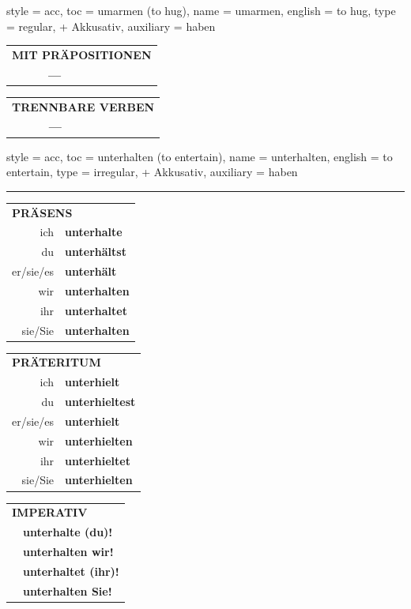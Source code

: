 \begin{verbentry}{
  style = {acc},
  toc = {umarmen (to hug)},
  name = {umarmen},
  english = {to hug},
  type = {regular, + Akkusativ},
  auxiliary = {haben}
}
\vspace{10pt}

\begin{tabular}{lll}
\multicolumn{3}{l}{\textbf{MIT PRÄPOSITIONEN}}\\
& \textbf{---} & \\
\end{tabular}
\hfill
\begin{tabular}{lll}
\multicolumn{3}{l}{\textbf{TRENNBARE VERBEN}}\\
& \textbf{---} & \\
\end{tabular}

\vspace{-5pt}
\end{verbentry}

\begin{verbentry}{
  style = {acc},
  toc = {unterhalten (to entertain)},
  name = {unterhalten},
  english = {to entertain},
  type = {irregular, + Akkusativ},
  auxiliary = {haben}
}


\vspace{5pt}
\hrule
\vspace{5pt}

\begin{tabular}{rl}
\multicolumn{2}{l}{\textbf{PRÄSENS}}\\
ich & \textbf{unterhalte}\\
du & \textbf{unterhältst}\\
er/sie/es & \textbf{unterhält}\\
wir & \textbf{unterhalten}\\
ihr & \textbf{unterhaltet}\\
sie/Sie & \textbf{unterhalten}\\
\end{tabular}
\hfill
\begin{tabular}{rl}
\multicolumn{2}{l}{\textbf{PRÄTERITUM}}\\
ich & \textbf{unterhielt}\\
du & \textbf{unterhieltest}\\
er/sie/es & \textbf{unterhielt}\\
wir & \textbf{unterhielten}\\
ihr & \textbf{unterhieltet}\\
sie/Sie & \textbf{unterhielten}\\
\end{tabular}
\hfill
\begin{tabular}{rl}
\multicolumn{2}{l}{\textbf{IMPERATIV}}\\
& \textbf{unterhalte (du)!}\\
& \textbf{unterhalten wir!}\\
& \textbf{unterhaltet (ihr)!}\\
& \textbf{unterhalten Sie!}\\
\end{tabular}


\end{verbentry}
